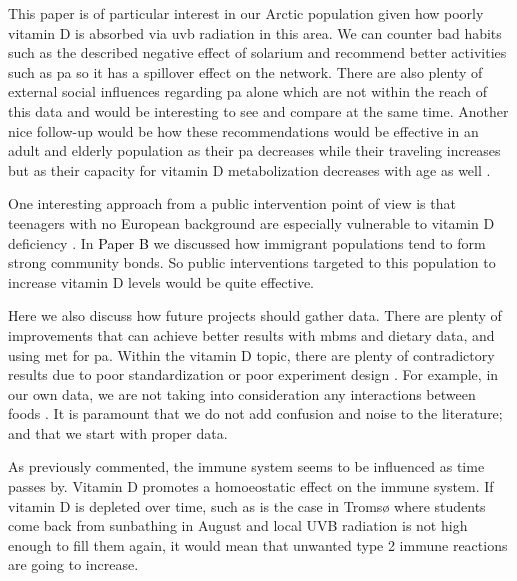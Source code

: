 This paper is of particular interest in our Arctic population given how poorly vitamin D is absorbed via \gls{uvb} radiation in this area. We can counter bad habits such as the described negative effect of solarium and recommend better activities such as \gls{pa} so it has a spillover effect on the network. There are also plenty of external social influences regarding \gls{pa} alone \cite{ref:SportsInfluenceBook} which are not within the reach of this data and would be interesting to see and compare at the same time. Another nice follow-up would be how these recommendations would be effective in an adult and elderly population as their \gls{pa} decreases while their traveling increases but as their capacity for vitamin D metabolization decreases with age as well \cite{ref:Chalcraft2020}.

One interesting approach from a public intervention point of view is that teenagers with no European background are especially vulnerable to vitamin D deficiency \cite{ref:ricketstats, ref:ricketstats, ref:Uday2017, ref:Munns2016, ref:B_Amrein2020, ref:A_Cashman2016, ref:C_Jiang2021, ref:D_Mogire2020}. In \colorbox{PaperColor}{\textcolor{black}{Paper B}} we discussed how immigrant populations tend to form strong community bonds. So public interventions targeted to this population to increase vitamin D levels would be quite effective.

Here we also discuss how future projects should gather data. There are plenty of improvements that can achieve better results with \gls{mbms} and dietary data, and using \gls{met} for \gls{pa}. Within the vitamin D topic, there are plenty of contradictory results \cite{Theodoratou2014, Chowdhury2014, Welsh2014} due to poor standardization or poor experiment design \cite{ref:A_Cashman2016, ref:Sempos2018, ref:Sempos20182}. For example, in our own data, we are not taking into consideration any interactions between foods \cite{ref:Li2020, ref:Lynch1980, ref:Li2020}. It is paramount that we do not add confusion and noise to the literature; and that we start with proper data.


As previously commented, the immune system seems to be influenced as time passes by. Vitamin D promotes a homoeostatic effect on the immune system. If vitamin D is depleted over time, such as is the case in Tromsø where students come back from sunbathing in August and local UVB radiation is not high enough to fill them again, it would mean that unwanted type 2 immune reactions \cite{Lloyd2018} are going to increase.

